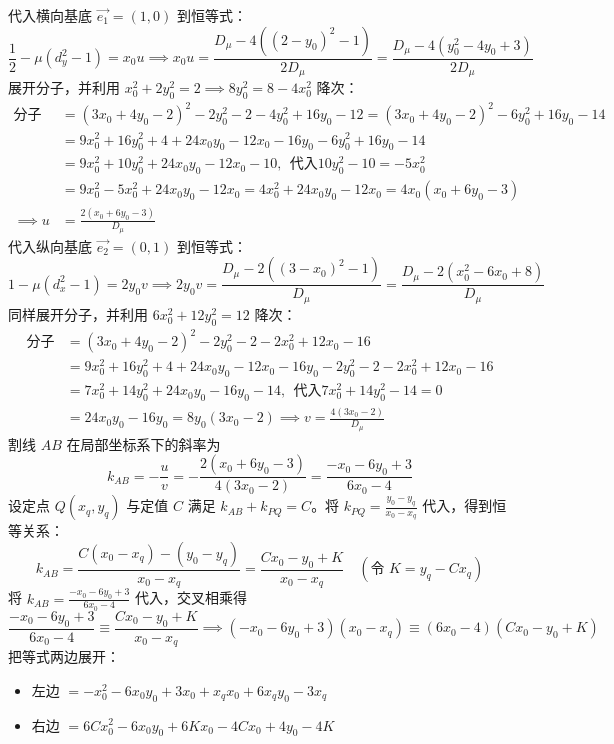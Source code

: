 \begin{solution}
代入横向基底 $\vec{e_1} = (1,0)$ 到恒等式：
$$\frac{1}{2} - \mu(d_y^2 - 1) = x_0 u \implies x_0 u = \frac{D_\mu - 4((2-y_0)^2 - 1)}{2 D_\mu} = \frac{D_\mu - 4(y_0^2 - 4y_0 + 3)}{2 D_\mu}$$
展开分子，并利用 $x_0^2 + 2y_0^2 = 2 \implies 8y_0^2 = 8 - 4x_0^2$ 降次：
\begin{align*}
\text{分子}& = (3x_0 + 4y_0 - 2)^2 - 2y_0^2 - 2 - 4y_0^2 + 16y_0 - 12 = (3x_0 + 4y_0 - 2)^2 - 6y_0^2 + 16y_0 - 14\\
&=9x_0^2 + 16y_0^2 + 4 + 24x_0 y_0 - 12x_0 - 16y_0 - 6y_0^2 + 16y_0 - 14 \\
&=9x_0^2 + 10y_0^2 + 24x_0 y_0 - 12x_0 - 10,~~\text{代入}10y_0^2 - 10 = -5x_0^2\\
&=9x_0^2 - 5x_0^2 + 24x_0 y_0 - 12x_0 = 4x_0^2 + 24x_0 y_0 - 12x_0 = 4x_0(x_0 + 6y_0 - 3)\\
\implies u &= \frac{2(x_0 + 6y_0 - 3)}{D_\mu}
\end{align*}
代入纵向基底 $\vec{e_2} = (0,1)$ 到恒等式：
$$1 - \mu(d_x^2 - 1) = 2y_0 v \implies 2y_0 v = \frac{D_\mu - 2((3-x_0)^2 - 1)}{D_\mu} = \frac{D_\mu - 2(x_0^2 - 6x_0 + 8)}{D_\mu}$$
同样展开分子，并利用 $6x_0^2 + 12y_0^2 = 12$ 降次：
\begin{align*}
\text{分子} &= (3x_0 + 4y_0 - 2)^2 - 2y_0^2 - 2 - 2x_0^2 + 12x_0 - 16\\
&= 9x_0^2 + 16y_0^2 + 4 + 24x_0 y_0 - 12x_0 - 16y_0 - 2y_0^2 - 2 - 2x_0^2 + 12x_0 - 16 \\
&= 7x_0^2 + 14y_0^2 + 24x_0 y_0 - 16y_0 - 14,~~\text{代入}7x_0^2 + 14y_0^2 - 14 = 0\\
&= 24x_0 y_0 - 16y_0 = 8y_0(3x_0 - 2)\implies v = \frac{4(3x_0 - 2)}{D_\mu}
\end{align*}
割线 $AB$ 在局部坐标系下的斜率为
$$k_{AB} = -\frac{u}{v} = - \frac{2(x_0 + 6y_0 - 3)}{4(3x_0 - 2)} = {\frac{-x_0 - 6y_0 + 3}{6x_0 - 4}}$$
设定点 $Q(x_q, y_q)$ 与定值 $C$ 满足 $k_{AB} + k_{PQ} = C$。将 $k_{PQ} = \frac{y_0 - y_q}{x_0 - x_q}$ 代入，得到恒等关系：
$$k_{AB} = \frac{C(x_0 - x_q) - (y_0 - y_q)}{x_0 - x_q} = \frac{C x_0 - y_0 + K}{x_0 - x_q} \quad (\text{令 } K = y_q - C x_q)$$
将 $k_{AB} = {\frac{-x_0 - 6y_0 + 3}{6x_0 - 4}}$ 代入，交叉相乘得
$$\frac{-x_0 - 6y_0 + 3}{6x_0 - 4} \equiv \frac{C x_0 - y_0 + K}{x_0 - x_q}\implies(-x_0 - 6y_0 + 3)(x_0 - x_q) \equiv (6x_0 - 4)(C x_0 - y_0 + K)$$
把等式两边展开：
\begin{itemize}
\item 左边 $= -x_0^2 - 6x_0 y_0 + 3x_0 + x_q x_0 + 6x_q y_0 - 3x_q$
\item 右边 $= 6C x_0^2 - 6x_0 y_0 + 6K x_0 - 4C x_0 + 4y_0 - 4K$

\end{itemize}
\end{solution}
